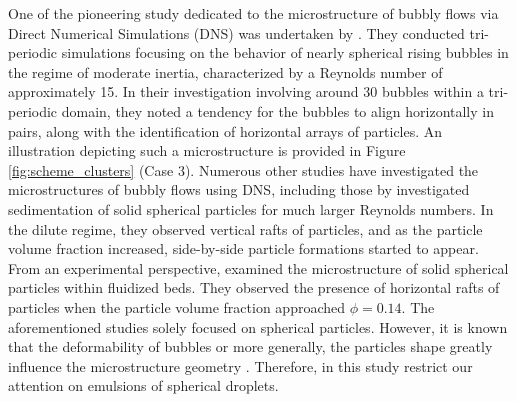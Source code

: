 One of the pioneering study dedicated to the microstructure of bubbly flows via Direct Numerical Simulations (DNS) was undertaken by \citet{bunner2002dynamics}. They conducted tri-periodic simulations focusing on the behavior of nearly spherical rising bubbles in the regime of moderate inertia, characterized by a Reynolds number of approximately 15. In their investigation involving around 30 bubbles within a tri-periodic domain, they noted a tendency for the bubbles to align horizontally in pairs, along with the identification of horizontal arrays of particles. An illustration depicting such a microstructure is provided in Figure \ref{fig:scheme_clusters} (Case 3). Numerous other studies have investigated the microstructures of bubbly flows using DNS, including those by \citet{yin2008lattice,roghair2011drag,zhang2023evolution}
\citet{shajahan2023inertial} investigated sedimentation of solid spherical particles for much larger Reynolds numbers.
In the dilute regime, they observed vertical rafts of particles, and as the particle volume fraction increased, side-by-side particle formations started to appear. 
From an experimental perspective, \citet{almeras2021statistics} examined the microstructure of solid spherical particles within fluidized beds.
They observed the presence of horizontal rafts of particles when the particle volume fraction approached $\phi = 0.14$.
The aforementioned studies solely focused on spherical particles.
However, it is known that the deformability of bubbles or more generally, the particles shape  greatly influence the microstructure geometry \citet{bunner2003effect,seyed2021sedimentation}. 
Therefore, in this study restrict our attention on emulsions of spherical droplets. 

